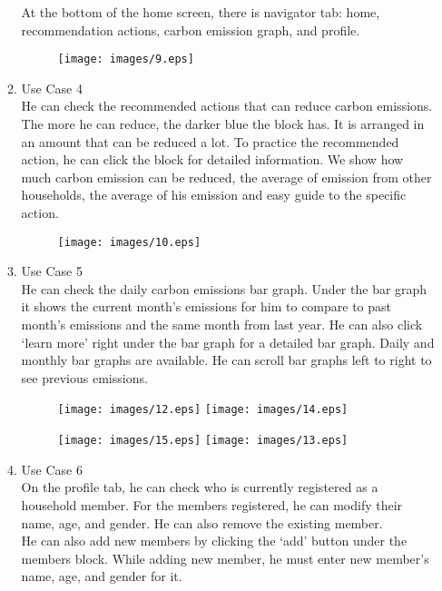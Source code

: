 \documentclass[11pt, conference]{IEEEtran}
\begin{document}
\begin{enumerate}[label=\arabic*]
\begin{enumerate}[label=\alph*]
        At the bottom of the home screen, there is navigator tab: home, recommendation actions, carbon emission graph, and profile.
        \begin{figure}[H]
            \centering
            \texttt{[image: images/9.eps]}
        \end{figure}
        \item Use Case 4\\
        He can check the recommended actions that can reduce carbon emissions. The more he can reduce, the darker blue the block has. It is arranged in an amount that can be reduced a lot. To practice the recommended action, he can click the block for detailed information. We show how much carbon emission can be reduced, the average of emission from other households, the average of his emission and easy guide to the specific action. \\
        \begin{figure}[H]
            \centering
            \texttt{[image: images/10.eps]}
        \end{figure}
        \item Use Case 5\\
        He can check the daily carbon emissions bar graph. Under the bar graph it shows the current month’s emissions for him to compare to past month’s emissions and the same month from last year. He can also click ‘learn more’ right under the bar graph for a detailed bar graph. Daily and monthly bar graphs are available. He can scroll bar graphs left to right to see previous emissions. 
        \begin{figure}[H]
            \centering
            \texttt{[image: images/12.eps]}
            \texttt{[image: images/14.eps]}
        \end{figure}
        \begin{figure}[H]
            \centering
            \texttt{[image: images/15.eps]}
            \texttt{[image: images/13.eps]}
        \end{figure}
        \item Use Case 6\\
        On the profile tab, he can check who is currently registered as a household member. For the members registered, he can modify their name, age, and gender. He can also remove the existing member.\\
        He can also add new members by clicking the ‘add’ button under the members block. While adding new member, he must enter new member’s name, age, and gender for it.
    \end{enumerate}
    

\end{enumerate}
\end{document}
